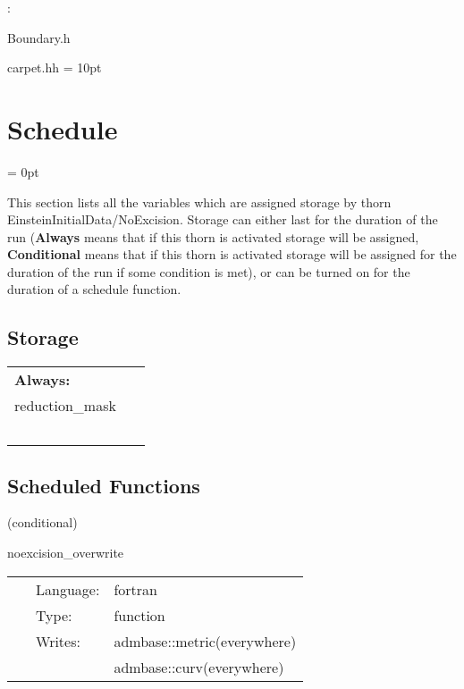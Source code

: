 \vspace{5mm}

: 

Boundary.h

carpet.hh
\vspace{2mm}\parskip = 10pt 

\section{Schedule} 


\parskip = 0pt


\noindent This section lists all the variables which are assigned storage by thorn EinsteinInitialData/NoExcision.  Storage can either last for the duration of the run ({\bf Always} means that if this thorn is activated storage will be assigned, {\bf Conditional} means that if this thorn is activated storage will be assigned for the duration of the run if some condition is met), or can be turned on for the duration of a schedule function.


\subsection*{Storage}

\hspace{5mm}

 \begin{tabular*}{160mm}{ll} 

{\bf Always:}&  ~ \\ 
 reduction\_mask & ~\\ 
~ & ~\\ 
\end{tabular*} 


\subsection*{Scheduled Functions}
\vspace{5mm}

   (conditional) 

\hspace{5mm} noexcision\_overwrite 

\hspace{5mm}{\it overwrite regions with minkowski } 


\hspace{5mm}

 \begin{tabular*}{160mm}{cll} 
~ & Language:  & fortran \\ 
~ & Type:  & function \\ 
~ & Writes:  & admbase::metric(everywhere) \\ 
~& ~ &admbase::curv(everywhere)\\ 
\end{tabular*} 


